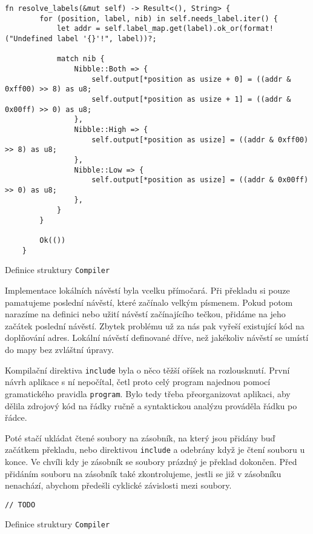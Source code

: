 \begin{listing}
\begin{verbatim}
fn resolve_labels(&mut self) -> Result<(), String> {
        for (position, label, nib) in self.needs_label.iter() {
            let addr = self.label_map.get(label).ok_or(format!("Undefined label '{}'!", label))?;

            match nib {
                Nibble::Both => {
                    self.output[*position as usize + 0] = ((addr & 0xff00) >> 8) as u8;
                    self.output[*position as usize + 1] = ((addr & 0x00ff) >> 0) as u8;
                },
                Nibble::High => {
                    self.output[*position as usize] = ((addr & 0xff00) >> 8) as u8;
                },
                Nibble::Low => {
                    self.output[*position as usize] = ((addr & 0x00ff) >> 0) as u8;
                },
            }
        }

        Ok(())
    }
\end{verbatim}
\caption{Definice struktury \texttt{Compiler}}
\label{fig:rust-result}
\end{listing}

Implementace lokálních návěstí byla vcelku přímočará. Při překladu si pouze pamatujeme poslední návěstí, které začínalo velkým písmenem. Pokud potom narazíme na definici nebo užití návěstí začínajícího tečkou, přidáme na jeho začátek poslední  návěstí. Zbytek problému už za nás pak vyřeší existující kód na doplňování adres. Lokální návěstí definované dříve, než jakékoliv  návěstí se umístí do mapy bez zvláštní úpravy.

Kompilační direktiva \texttt{include} byla o něco těžší oříšek na rozlousknutí. První návrh aplikace s ní nepočítal, četl proto celý program najednou pomocí gramatického pravidla \texttt{program}. Bylo tedy třeba přeorganizovat aplikaci, aby dělila zdrojový kód na řádky ručně a syntaktickou analýzu prováděla řádku po řádce.

Poté stačí ukládat čtené soubory na zásobník, na který jsou přidány buď začátkem překladu, nebo direktivou \texttt{include} a odebrány když je čtení souboru u konce. Ve chvíli kdy je zásobník se soubory prázdný je překlad dokončen. Před přidáním souboru na zásobník také zkontrolujeme, jestli se již v zásobníku nenachází, abychom předešli cyklické závislosti mezi soubory.

\begin{listing}
\begin{verbatim}
// TODO
\end{verbatim}
\caption{Definice struktury \texttt{Compiler}}
\label{fig:rust-file-stack}
\end{listing}


